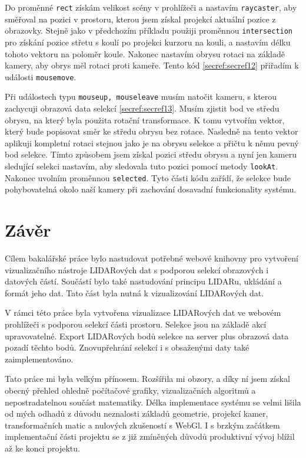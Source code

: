 \documentclass[czech,bachelor,dept420,male,cpdeclaration]{diploma}
\begin{document}


Do proměnné \texttt{rect} získám velikost scény v prohlížeči a nastavím \texttt{raycaster}, aby směřoval na pozici v prostoru, kterou jsem získal projekcí aktuální pozice z obrazovky. Stejně jako v předchozím příkladu použiji proměnnou \texttt{intersection} pro získání pozice střetu s koulí po projekci kurzoru na kouli, a nastavím délku tohoto vektoru na poloměr koule. Nakonec nastavím obrysu rotaci na základě kamery, aby obrys měl rotaci proti kameře. Tento kód \ref{secref:secref12} přiřadím k události \texttt{mousemove}.    



Při událostech typu \texttt{mouseup, mouseleave} musím natočit kameru, s kterou zachycuji obrazová data selekcí \ref{secref:secref13}. Musím zjistit bod ve středu obrysu, na který byla použita rotační transformace. K tomu vytvořím vektor, který bude popisovat směr ke středu obrysu bez rotace. Nasledně na tento vektor aplikuji kompletní rotaci stejnou jako je na obrysu selekce a přičtu k němu pevný bod selekce. Tímto způsobem jsem získal pozici středu obrysu a nyní jen kameru sledující selekci nastavím, aby sledovala tuto pozici pomocí metody \texttt{lookAt}. Nakonec uvolním proměnnou \texttt{selected}. Tyto části kódu zařídí, že selekce bude pohybovatelná okolo naší kamery při zachování dosavadní funkcionality systému.


\section{Závěr}
Cílem bakalářské práce bylo nastudovat potřebné webové knihovny pro vytvoření vizualizačního nástroje LIDARových dat s podporou selekcí obrazových i datových částí. Součástí bylo také nastudování principu LIDARu, ukládání a formát jeho dat. Tato část byla nutná k vizualizování LIDARových dat.

V rámci této práce byla vytvořena vizualizace LIDARových dat ve webovém prohlížeči s podporou selekcí části prostoru. Selekce jsou na základě akcí upravovatelné. Export LIDARových bodů selekce na server plus obrazová data pozadí těchto bodů. Znovupřehrání selekcí i s obsaženými daty také zaimplementováno.

Tato práce mi byla velkým přínosem. Rozšířila mi obzory, a díky ní jsem získal obecný přehled ohledně počítačové grafiky, vizualizačních algoritmů a nepostradatelnou součást matematiky. Délka implementace systému se velmi lišila od mých odhadů z důvodu neznalosti základů geometrie, projekcí kamer, transformačních matic a nulových zkušeností s WebGl. I s brzkým začátkem implementační části projektu se z již zmíněných důvodů produktivní vývoj blížil až ke konci projektu.
 
\end{document}
